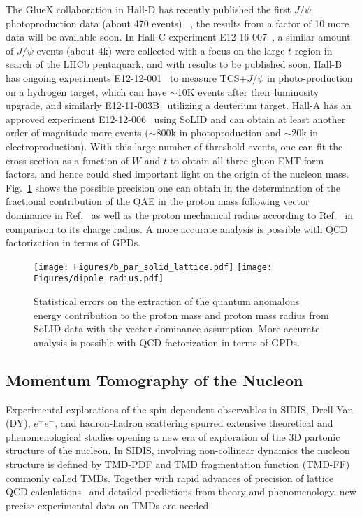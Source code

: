 The GlueX collaboration in Hall-D has recently published the first $J/\psi$ photoproduction data (about 470 events) ~\cite{Ali:2019lzf}, the results from a factor of 10 more data will be available soon. In Hall-C experiment E12-16-007~\cite{Meziani:2016lhg}, a similar amount of $J/\psi$ events (about 4k) were collected with a focus on the large $t$ region in search of the LHCb pentaquark, and with results to be published soon. Hall-B has ongoing experiments E12-12-001~\cite{E12-12-001} to measure TCS+$J/\psi$ in photo-production on a hydrogen target, which can have $\sim$10K events after their luminosity upgrade, and similarly E12-11-003B~\cite{E12-11-003B} utilizing a deuterium target. Hall-A has an approved experiment E12-12-006~\cite{SoLIDjpsi:proposal} using SoLID and can obtain at least another order of magnitude more events ($\sim$800k in photoproduction and $\sim$20k in electroproduction). With this large number of  threshold events, one can fit the cross section as a function of $W$ 
and $t$ %
to obtain all three gluon EMT form factors, and hence could shed important light on the origin of the nucleon mass. %
 Fig.~\ref{fig:mass} shows the possible precision one can obtain in the determination of the fractional contribution of the QAE in the proton mass following vector dominance in Ref.~\cite{Wang:2019mza} as well as the proton mechanical radius according to Ref.~\cite{Kharzeev:2021qkd} in comparison to its charge radius. A more accurate analysis is possible with QCD factorization in terms of GPDs.

\begin{figure}
\begin{center}
\texttt{[image: Figures/b\_par\_solid\_lattice.pdf]}
\texttt{[image: Figures/dipole\_radius.pdf]}
\caption{Statistical errors on the extraction of the quantum anomalous energy contribution to the proton mass and proton mass radius from SoLID data with the vector dominance assumption. More accurate analysis is possible with QCD factorization in terms
of GPDs.}
\label{fig:mass} 
\end{center}
\end{figure}

\subsection{Momentum Tomography of the Nucleon } 
\label{sec:MomTomNucleon}

Experimental explorations of the spin dependent observables in SIDIS, Drell-Yan (DY), $e^+e^-$, and hadron-hadron scattering spurred extensive theoretical and phenomenological studies opening a new era of exploration of the 3D partonic structure of the nucleon. In SIDIS, involving non-collinear dynamics the nucleon structure is defined by TMD-PDF and TMD fragmentation function (TMD-FF) commonly called TMDs. Together with rapid advances of precision of lattice QCD calculations~\cite{Hagler:2009mb,Musch:2009ku,Musch:2010ka,Ji:2013dva,Ji:2020ect} and detailed predictions from theory and phenomenology, new precise experimental data on TMDs are needed. 

